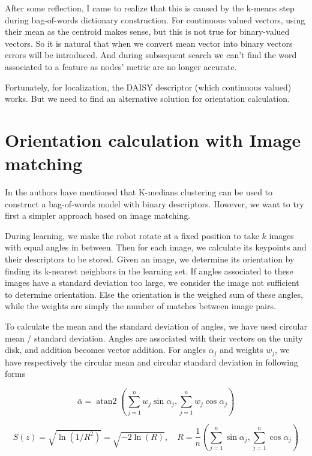 \documentclass[a4paper]{scrartcl}
\begin{document}
After some reflection, I came to realize that this is caused by the k-means step during bag-of-words dictionary construction. For continuous valued vectors, using their mean as the centroid makes sense, but this is not true for binary-valued vectors. So it is natural that when we convert mean vector into binary vectors errors will be introduced. And during subsequent search we can't find the word associated to a feature as nodes' metric are no longer accurate. %

Fortunately, for localization, the DAISY descriptor (which continuous valued) works. But we need to find an alternative solution for orientation calculation.

\newpage
\section{Orientation calculation with Image matching}
\label{orientation_original}
In \autocite{Galvez-Lopez2012BagsSequences} the authors have mentioned that K-medians clustering can be used to construct a bag-of-words model with binary descriptors. However, we want to try first a simpler approach based on image matching.

During learning, we make the robot rotate at a fixed position to take $k$ images with equal angles in between. Then for each image, we calculate its keypoints and their descriptors to be stored. Given an image, we determine its orientation by finding its k-nearest neighbors in the learning set. If angles associated to these images have a standard deviation too large, we consider the image not sufficient to determine orientation. Else the orientation is the weighed sum of these angles, while the weights are simply the number of matches between image pairs. 

To calculate the mean and the standard deviation of angles, we have used circular mean / standard deviation. Angles are associated with their vectors on the unity disk, and addition becomes vector addition. For angles $\alpha_j$ and weights $w_j$, we have respectively the circular mean and circular standard deviation in following forms%

\begin{equation}
{\displaystyle {\bar {\alpha }}=\operatorname {atan2} \left(\sum _{j=1}^{n} w_j\sin \alpha _{j},\sum _{j=1}^{n} w_j\cos \alpha _{j}\right)}
\end{equation}

\begin{equation}
S(z)={\sqrt {\ln(1/R^{2})}}={\sqrt {-2\ln(R)}}, \quad R = \frac{1}{n}\left(\sum _{j=1}^{n} \sin \alpha _{j},\sum _{j=1}^{n} \cos \alpha _{j}\right)
\end{equation}
\end{document}
